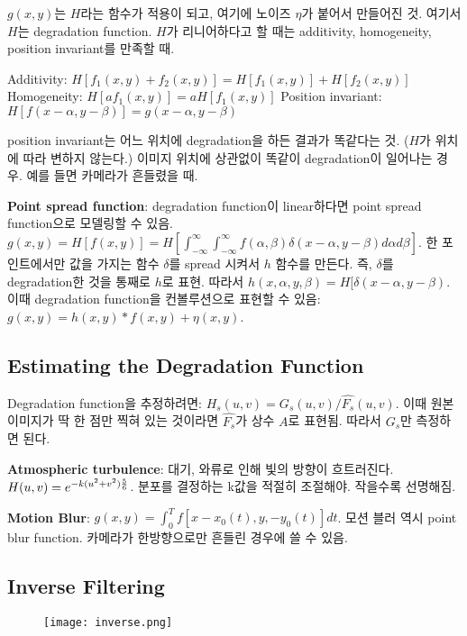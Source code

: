 $g(x, y)$는 $H$라는 함수가 적용이 되고, 여기에 노이즈 $\eta$가 붙어서 만들어진 것. 여기서 $H$는 degradation function. $H$가 리니어하다고 할 때는 additivity, homogeneity, position invariant를 만족할 때.

\bitmz
  \itm Additivity: $H[f_1(x, y) + f_2(x, y)] = H[f_1(x, y)] + H[f_2(x, y)]$
  \itm Homogeneity: $H[af_1(x, y)] = aH[f_1(x, y)]$
  \itm Position invariant: $H[f(x - \alpha, y - \beta)] = g(x - \alpha, y - \beta)$
\eitmz

position invariant는 어느 위치에 degradation을 하든 결과가 똑같다는 것. ($H$가 위치에 따라 변하지 않는다.) 이미지 위치에 상관없이 똑같이 degradation이 일어나는 경우. 예를 들면 카메라가 흔들렸을 때.

\textbf{Point spread function}: degradation function이 linear하다면 point spread function으로 모델링할 수 있음. $g(x, y) = H[f(x, y)] = H[\int_{-\infty}^{\infty} \int_{-\infty}^{\infty} f(\alpha, \beta) \delta(x - \alpha, y - \beta) d\alpha d\beta]$. 한 포인트에서만 값을 가지는 함수 $\delta$를 spread 시켜서 $h$ 함수를 만든다. 즉, $\delta$를 degradation한 것을 통째로 $h$로 표현. 따라서 $h(x, \alpha, y, \beta) = H[\delta(x - \alpha, y - \beta)$. 이때 degradation function을 컨볼루션으로 표현할 수 있음: $g(x, y) = h(x, y) \ast f(x, y) + \eta(x, y)$.

\subsection{Estimating the Degradation Function}

Degradation function을 추정하려면: $H_s(u, v) = G_s(u, v) / \hat{F_s}(u, v)$. 이때 원본 이미지가 딱 한 점만 찍혀 있는 것이라면 $\hat{F_s}$가 상수 $A$로 표현됨. 따라서 $G_s$만 측정하면 된다.

\textbf{Atmospheric turbulence}: 대기, 와류로 인해 빛의 방향이 흐트러진다. $H(u, v) = e^{-k(u^2 + v^2){5 \over 6}}$. 분포를 결정하는 k값을 적절히 조절해야. 작을수록 선명해짐.

\textbf{Motion Blur}: $g(x, y) = \int_0^T f[x - x_0(t), y, - y_0(t)]dt$. 모션 블러 역시 point blur function. 카메라가 한방향으로만 흔들린 경우에 쓸 수 있음.

\subsection{Inverse Filtering}

\begin{figure}[h]
  \centering
  \texttt{[image: inverse.png]}
\end{figure}

